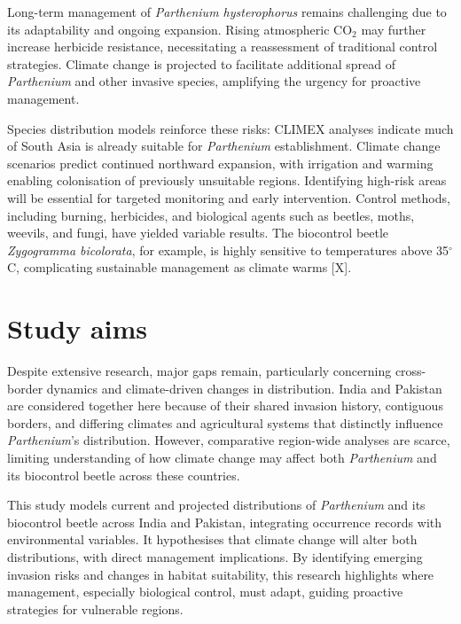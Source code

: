 Long-term management of \textit{Parthenium hysterophorus} remains challenging due to its adaptability and ongoing expansion. Rising atmospheric CO$_2$ may further increase herbicide resistance, necessitating a reassessment of traditional control strategies. Climate change is projected to facilitate additional spread of \textit{Parthenium} and other invasive species, amplifying the urgency for proactive management.

Species distribution models reinforce these risks: CLIMEX analyses indicate much of South Asia is already suitable for \textit{Parthenium} establishment. Climate change scenarios predict continued northward expansion, with irrigation and warming enabling colonisation of previously unsuitable regions. Identifying high-risk areas will be essential for targeted monitoring and early intervention. Control methods, including burning, herbicides, and biological agents such as beetles, moths, weevils, and fungi, have yielded variable results. The biocontrol beetle \textit{Zygogramma bicolorata}, for example, is highly sensitive to temperatures above 35$^{\circ}$C, complicating sustainable management as climate warms [X].

\section{Study aims}

Despite extensive research, major gaps remain, particularly concerning cross-border dynamics and climate-driven changes in distribution. India and Pakistan are considered together here because of their shared invasion history, contiguous borders, and differing climates and agricultural systems that distinctly influence \textit{Parthenium}'s distribution. However, comparative region-wide analyses are scarce, limiting understanding of how climate change may affect both \textit{Parthenium} and its biocontrol beetle across these countries.

This study models current and projected distributions of \textit{Parthenium} and its biocontrol beetle across India and Pakistan, integrating occurrence records with environmental variables. It hypothesises that climate change will alter both distributions, with direct management implications. By identifying emerging invasion risks and changes in habitat suitability, this research highlights where management, especially biological control, must adapt, guiding proactive strategies for vulnerable regions.